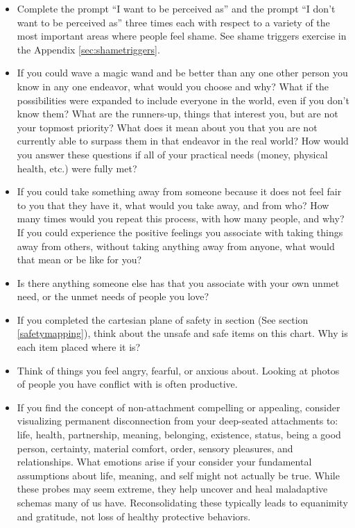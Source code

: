 \documentclass[12pt,letterpaper]{article}
\begin{document}
\begin{itemize}
    \item Complete the prompt “I want to be perceived as” and the prompt “I don't want to be perceived as” three times each with respect to a variety of the most important areas where people feel shame. See shame triggers exercise in the Appendix \ref{sec:shametriggers}.
    \item If you could wave a magic wand and be better than any one other person you know in any one endeavor, what would you choose and why? What if the possibilities were expanded to include everyone in the world, even if you don't know them? What are the runners-up, things that interest you, but are not your topmost priority? What does it mean about you that you are not currently able to surpass them in that endeavor in the real world? How would you answer these questions if all of your practical needs (money, physical health, etc.) were fully met?
    \item If you could take something away from someone because it does not feel fair to you that they have it, what would you take away, and from who? How many times would you repeat this process, with how many people, and why? If you could experience the positive feelings you associate with taking things away from others, without taking anything away from anyone, what would that mean or be like for you?
    \item Is there anything someone else has that you associate with your own unmet need, or the unmet needs of people you love?
    \item If you completed the cartesian plane of safety in section (See section \ref{safetymapping}), think about the unsafe and safe items on this chart. Why is each item placed where it is?
    \item Think of things you feel angry, fearful, or anxious about. Looking at photos of people you have conflict with is often productive.
    \item If you find the concept of non-attachment compelling or appealing, consider visualizing permanent disconnection from your deep-seated attachments to: life, health, partnership, meaning, belonging, existence, status, being a good person, certainty, material comfort, order, sensory pleasures, and relationships. What emotions arise if your consider your fundamental assumptions about life, meaning, and self might not actually be true. While these probes may seem extreme, they help uncover and heal maladaptive schemas many of us have. Reconsolidating these typically leads to equanimity and gratitude, not loss of healthy protective behaviors.

\end{itemize}
\end{document}
